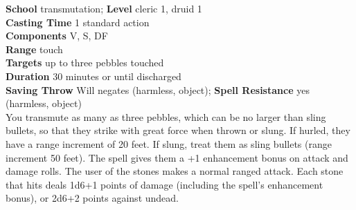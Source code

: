 \textbf{School} transmutation; \textbf{Level} cleric 1, druid 1\\
\textbf{Casting Time} 1 standard action\\
\textbf{Components} V, S, DF\\
\textbf{Range} touch\\
\textbf{Targets} up to three pebbles touched\\
\textbf{Duration} 30 minutes or until discharged\\
\textbf{Saving Throw }Will negates (harmless, object); \textbf{Spell Resistance} yes (harmless, object)\\
You transmute as many as three pebbles, which can be no larger than sling bullets, so that they strike with great force when thrown or slung. If hurled, they have a range increment of 20 feet. If slung, treat them as sling bullets (range increment 50 feet). The spell gives them a +1 enhancement bonus on attack and damage rolls. The user of the stones makes a normal ranged attack\textit{. }Each stone that hits deals 1d6+1 points of damage (including the spell's enhancement bonus), or 2d6+2 points against undead.\\
